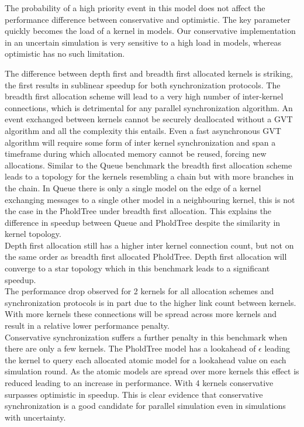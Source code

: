 The probability of a high priority event in this model does not affect the performance difference between conservative and optimistic. The key parameter quickly becomes the load of a kernel in models. Our conservative implementation in an uncertain simulation is very sensitive to a high load in models, whereas optimistic has no such limitation.

The difference between depth first and breadth first allocated kernels is striking, the first results in sublinear speedup for both synchronization protocols. %
The breadth first allocation scheme will lead to a very high number of inter-kernel connections, which is detrimental for any parallel synchronization algorithm. An event exchanged between kernels cannot be securely deallocated without a GVT algorithm and all the complexity this entails. Even a fast asynchronous GVT algorithm will require some form of inter kernel synchronization and span a timeframe during which allocated memory cannot be reused, forcing new allocations.
Similar to the Queue benchmark the breadth first allocation scheme leads to a topology for the kernels resembling a chain but with more branches in the chain. In Queue there is only a single model on the edge of a kernel exchanging messages to a single other model in a neighbouring kernel, this is not the case in the PholdTree under breadth first allocation. This explains the difference in speedup between Queue and PholdTree despite the similarity in kernel topology.\\
Depth first allocation still has a higher inter kernel connection count, but not on the same order as breadth first allocated PholdTree. Depth first allocation will converge to a star topology which in this benchmark leads to a significant speedup.\\
The performance drop observed for 2 kernels for all allocation schemes and synchronization protocols is in part due to the higher link count between kernels. With more kernels these connections will be spread across more kernels and result in a relative lower performance penalty. \\
Conservative synchronization suffers a further penalty in this benchmark when there are only a few kernels. The PholdTree model has a lookahead of $\epsilon$ leading the kernel to query each allocated atomic model for a lookahead value on each simulation round. As the atomic models are spread over more kernels this effect is reduced leading to an increase in performance. With 4 kernels conservative surpasses optimistic in speedup. This is clear evidence that conservative synchronization is a good candidate for parallel simulation even in simulations with uncertainty.
